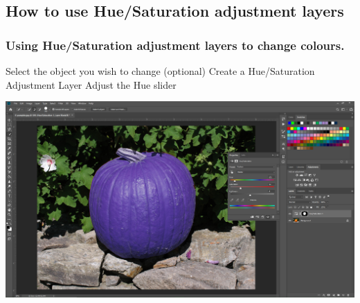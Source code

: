 \documentclass{beamer}
\begin{document}
			\subsection{How to use Hue/Saturation adjustment layers}		
				\begin{frame}
					\frametitle{Using Hue/Saturation adjustment layers to change colours.}
									\begin{outline}
						\1 Select the object you wish to change (optional)
						\1 Create a Hue/Saturation Adjustment Layer
						\1 Adjust the Hue slider
					\end{outline}
				\includegraphics[width=1.0\textwidth]{images/changing color with huge.png}
				\end{frame}

	
	
\end{document}
